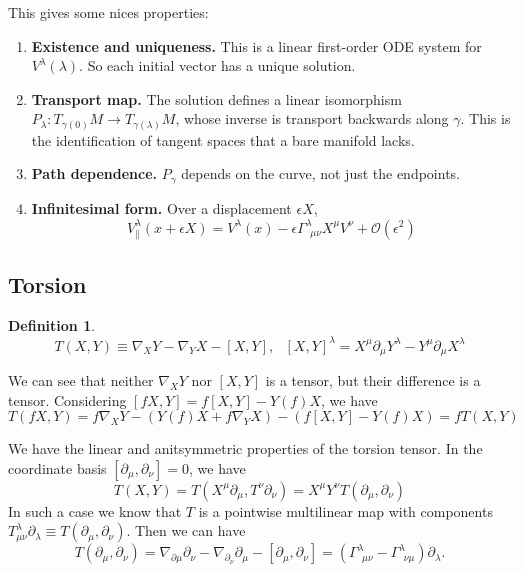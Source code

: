 \documentclass{article}
\newtheorem{definition}{Definition}[section]
\begin{document}
This gives some nices properties:
\begin{enumerate}
    \item \textbf{Existence and uniqueness.} This is a linear first-order ODE system for $V^\lambda(\lambda)$. So each initial vector has a unique solution.
    \item \textbf{Transport map.} The solution defines a linear isomorphism $P_\lambda : T_{\gamma(0)} M\rightarrow T_{\gamma(\lambda)} M$, whose inverse is transport backwards along $\gamma$. This is the identification of tangent spaces that a bare manifold lacks.
    \item \textbf{Path dependence.} $P_\gamma$ depends on the curve, not just the endpoints.
    \item  \textbf{Infinitesimal form.} Over a displacement $\epsilon X$,
    \begin{equation}
        V^\lambda_{\parallel}(x+\epsilon X) = V^\lambda(x) - \epsilon \Gamma^\lambda_{~~\mu\nu} X^\mu V^\nu + \mathcal{O}(\epsilon^2)
    \end{equation}
\end{enumerate}
\subsection{Torsion}
\begin{definition}
    \begin{equation}
        T(X,Y) \equiv \nabla_X Y -\nabla_Y X -[X,Y], ~~~[X,Y]^\lambda = X^\mu\partial_\mu Y^\lambda - Y^\mu \partial_\mu X^\lambda
    \end{equation}
\end{definition}

We can see that neither $\nabla_X Y$ nor $[X,Y]$ is a tensor, but their difference is a tensor. Considering $[fX,Y] = f[X,Y] -Y(f)X$, we have
\begin{equation}
    T(fX,Y)=f\nabla_X Y - (Y(f)X +f\nabla_YX) - (f[X,Y]-Y(f)X)= fT(X,Y)
\end{equation}

We have the linear and anitsymmetric properties of the torsion tensor. In the coordinate basis $[\partial_\mu, \partial_\nu]=0$, we have
\begin{equation}
    T(X,Y) = T(X^\mu\partial_\mu,T^\nu\partial_\nu)= X^\mu Y^\nu T(\partial_\mu,\partial_\nu)
\end{equation}
In such a case we know that $T$ is a pointwise multilinear map with components $T^\lambda_{\mu\nu}\partial_\lambda \equiv T(\partial_\mu,\partial_\nu)$. Then we can have
\begin{equation}
    T(\partial_\mu,\partial_\nu)=\nabla_{\partial\mu}\partial_\nu - \nabla_{\partial_\nu} \partial_\mu -[\partial_\mu,\partial_\nu]=(\Gamma^\lambda_{~~\mu\nu}-\Gamma^\lambda_{~~\nu\mu})\partial_\lambda.
\end{equation}
\end{document}
